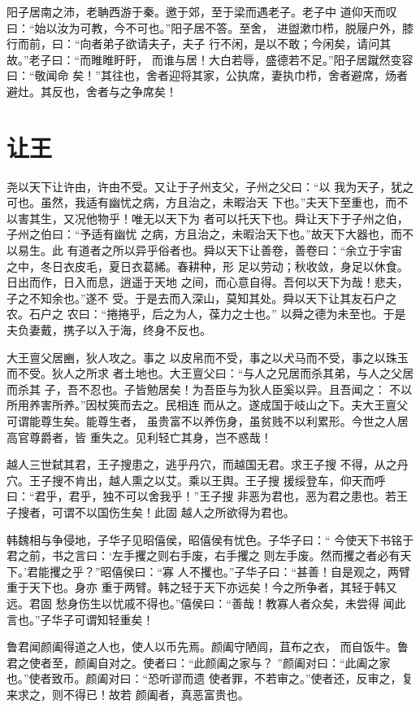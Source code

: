 \documentclass[a4paper,12pt,UTF8,twoside]{ctexbook}
\begin{document}
阳子居南之沛，老聃西游于秦。邀于郊，至于梁而遇老子。老子中 道仰天而叹曰：“始以汝为可教，今不可也。”阳子居不答。至舍， 进盥漱巾栉，脱屦户外，膝行而前，曰：“向者弟子欲请夫子，夫子 行不闲，是以不敢；今闲矣，请问其故。”老子曰：“而睢睢盱盱， 而谁与居！大白若辱，盛德若不足。”阳子居蹴然变容曰：“敬闻命 矣！”其往也，舍者迎将其家，公执席，妻执巾栉，舍者避席，炀者 避灶。其反也，舍者与之争席矣！
\section{让王}

尧以天下让许由，许由不受。又让于子州支父，子州之父曰：“以 我为天子，犹之可也。虽然，我适有幽忧之病，方且治之，未暇治天 下也。”夫天下至重也，而不以害其生，又况他物乎！唯无以天下为 者可以托天下也。舜让天下于子州之伯，子州之伯曰：“予适有幽忧 之病，方且治之，未暇治天下也。”故天下大器也，而不以易生。此 有道者之所以异乎俗者也。舜以天下让善卷，善卷曰：“余立于宇宙 之中，冬日衣皮毛，夏日衣葛絺。春耕种，形 足以劳动；秋收敛，身足以休食。日出而作，日入而息，逍遥于天地 之间，而心意自得。吾何以天下为哉！悲夫，子之不知余也。”遂不 受。于是去而入深山，莫知其处。舜以天下让其友石户之农。石户之 农曰：“捲捲乎，后之为人，葆力之士也。” 以舜之德为未至也。于是夫负妻戴，携子以入于海，终身不反也。

大王亶父居豳，狄人攻之。事之 以皮帛而不受，事之以犬马而不受，事之以珠玉而不受。狄人之所求 者土地也。大王亶父曰：“与人之兄居而杀其弟，与人之父居而杀其 子，吾不忍也。子皆勉居矣！为吾臣与为狄人臣奚以异。且吾闻之： 不以所用养害所养。”因杖筴而去之。民相连 而从之。遂成国于岐山之下。夫大王亶父可谓能尊生矣。能尊生者， 虽贵富不以养伤身，虽贫贱不以利累形。今世之人居高官尊爵者，皆 重失之。见利轻亡其身，岂不惑哉！

越人三世弑其君，王子搜患之，逃乎丹穴，而越国无君。求王子搜 不得，从之丹穴。王子搜不肯出，越人熏之以艾。乘以王舆。王子搜 援绥登车，仰天而呼曰：“君乎，君乎，独不可以舍我乎！”王子搜 非恶为君也，恶为君之患也。若王子搜者，可谓不以国伤生矣！此固 越人之所欲得为君也。

韩魏相与争侵地，子华子见昭僖侯，昭僖侯有忧色。子华子曰：“ 今使天下书铭于君之前，书之言曰：‘左手攫之则右手废，右手攫之 则左手废。然而攫之者必有天下。’君能攫之乎？”昭僖侯曰：“寡 人不攫也。”子华子曰：“甚善！自是观之，两臂重于天下也。身亦 重于两臂。韩之轻于天下亦远矣！今之所争者，其轻于韩又远。君固 愁身伤生以忧戚不得也。”僖侯曰：“善哉！教寡人者众矣，未尝得 闻此言也。”子华子可谓知轻重矣！

鲁君闻颜阖得道之人也，使人以币先焉。颜阖守陋闾，苴布之衣， 而自饭牛。鲁君之使者至，颜阖自对之。使者曰：“此颜阖之家与？ ”颜阖对曰：“此阖之家也。”使者致币。颜阖对曰：“恐听谬而遗 使者罪，不若审之。”使者还，反审之，复来求之，则不得已！故若 颜阖者，真恶富贵也。
\end{document}
